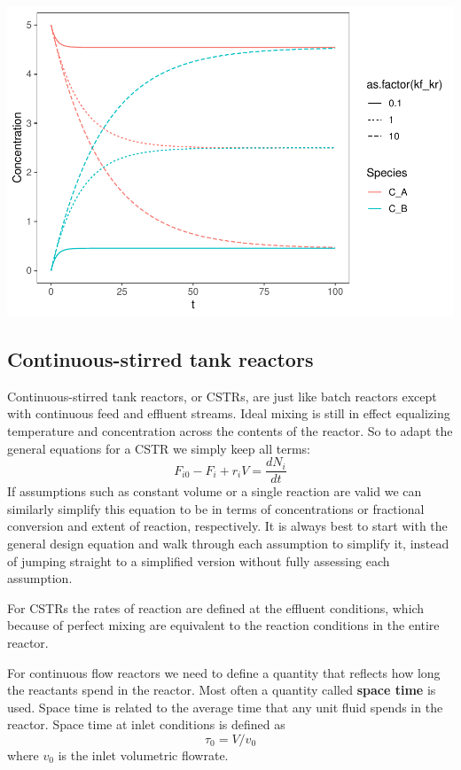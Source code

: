 \documentclass[
]{article}
\begin{document}
\includegraphics{Bioprocess_Engineering_files/figure-latex/unnamed-chunk-14-1.pdf}

\hypertarget{continuous-stirred-tank-reactors}{%
\subsection{Continuous-stirred tank reactors}\label{continuous-stirred-tank-reactors}}

Continuous-stirred tank reactors, or CSTRs, are just like batch reactors except with continuous feed and effluent streams. Ideal mixing is still in effect equalizing temperature and concentration across the contents of the reactor. So to adapt the general equations for a CSTR we simply keep all terms:
\[F_{i0} - F_i + r_iV = \frac{dN_i}{dt}\]
If assumptions such as constant volume or a single reaction are valid we can similarly simplify this equation to be in terms of concentrations or fractional conversion and extent of reaction, respectively. It is always best to start with the general design equation and walk through each assumption to simplify it, instead of jumping straight to a simplified version without fully assessing each assumption.

For CSTRs the rates of reaction are defined at the effluent conditions, which because of perfect mixing are equivalent to the reaction conditions in the entire reactor.

For continuous flow reactors we need to define a quantity that reflects how long the reactants spend in the reactor. Most often a quantity called \textbf{space time} is used. Space time is related to the average time that any unit fluid spends in the reactor. Space time at inlet conditions is defined as
\[\tau_0 = V/v_0\]
where \(v_0\) is the inlet volumetric flowrate.
\end{document}
